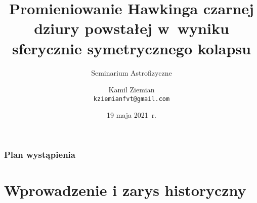 \documentclass[10pt,t]{beamer}
\title{Promieniowanie Hawkinga czarnej dziury powstałej w~wyniku sferycznie
  symetrycznego kolapsu}
\subtitle{Seminarium Astrofizyczne}
\author{Kamil Ziemian \\
  \texttt{kziemianfvt@gmail.com}}
\institute{Zakład Teorii Pola, \\
  Uniwersytet Jagielloński w~Krakowie}
\date[19 maja 2021~r.]{19 maja 2021~r.}
\begin{document}






\RaggedRight





\maketitle %





\begin{frame}
  \frametitle{Plan wystąpienia}


  \tableofcontents

\end{frame}











\section{Wprowadzenie i zarys historyczny}
\end{document}
